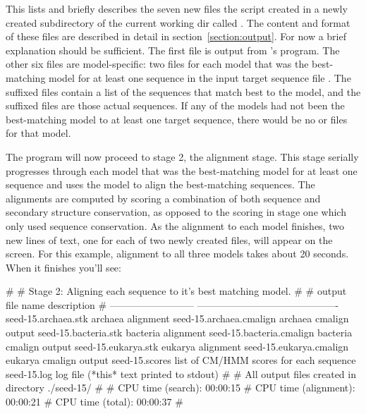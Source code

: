 This lists and briefly describes the seven new files the script created
in a newly created subdirectory of the current working dir called
. The content and format of these files are described
in detail in section~\ref{section:output}. For now a brief explanation
should be sufficient. The first file  is output from
's  program. The other six files are
model-specific: two files for each model that was the best-matching
model for at least one sequence in the input target sequence file
. The  suffixed files contain a list
of the sequences that match best to the model, and the 
suffixed files are those actual sequences. If any of the models had
not been the best-matching model to at least one target sequence,
there would be no  or  files for that
model.

The program will now proceed to stage 2, the alignment stage. This
stage serially progresses through each model that was the
best-matching model for at least one sequence and uses the model to
align the best-matching sequences. The alignments are computed by scoring
a combination of both sequence and secondary structure conservation,
as opposed to the scoring in stage one which only used sequence
conservation. As the alignment to each model finishes, two new lines
of text, one for each of two newly created files, will appear on the
screen. For this example, alignment to all three models takes about 20
seconds. When it finishes you'll see:

\newpage

\begin{sreoutput}
#
# Stage 2: Aligning each sequence to it's best matching model.
#
# output file name            description
# --------------------------  -------------------------------------------
  seed-15.archaea.stk         archaea alignment
  seed-15.archaea.cmalign     archaea cmalign output
  seed-15.bacteria.stk        bacteria alignment
  seed-15.bacteria.cmalign    bacteria cmalign output
  seed-15.eukarya.stk         eukarya alignment
  seed-15.eukarya.cmalign     eukarya cmalign output
  seed-15.scores              list of CM/HMM scores for each sequence
  seed-15.log                 log file (*this* text printed to stdout)
#
# All output files created in directory ./seed-15/
#
# CPU time (search):     00:00:15
# CPU time (alignment):  00:00:21
# CPU time (total):      00:00:37
#
\end{sreoutput}

